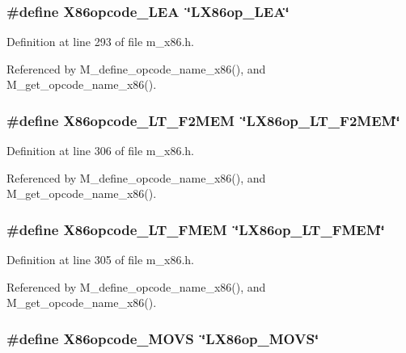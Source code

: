 \subsubsection{\setlength{\rightskip}{0pt plus 5cm}\#define X86opcode\_\-LEA~\char`\"{}LX86op\_\-LEA\char`\"{}}\label{m__x86_8h_12407053409c969238051cc5d5275d59}




Definition at line 293 of file m\_\-x86.h.

Referenced by M\_\-define\_\-opcode\_\-name\_\-x86(), and M\_\-get\_\-opcode\_\-name\_\-x86().
\subsubsection{\setlength{\rightskip}{0pt plus 5cm}\#define X86opcode\_\-LT\_\-F2MEM~\char`\"{}LX86op\_\-LT\_\-F2MEM\char`\"{}}\label{m__x86_8h_00d980f859b868baab9717c33f935569}




Definition at line 306 of file m\_\-x86.h.

Referenced by M\_\-define\_\-opcode\_\-name\_\-x86(), and M\_\-get\_\-opcode\_\-name\_\-x86().
\subsubsection{\setlength{\rightskip}{0pt plus 5cm}\#define X86opcode\_\-LT\_\-FMEM~\char`\"{}LX86op\_\-LT\_\-FMEM\char`\"{}}\label{m__x86_8h_e96351a0d686d50015ebb5720e393e08}




Definition at line 305 of file m\_\-x86.h.

Referenced by M\_\-define\_\-opcode\_\-name\_\-x86(), and M\_\-get\_\-opcode\_\-name\_\-x86().
\subsubsection{\setlength{\rightskip}{0pt plus 5cm}\#define X86opcode\_\-MOVS~\char`\"{}LX86op\_\-MOVS\char`\"{}}\label{m__x86_8h_8931580fdca46a2b4c2cc56df85279ec}





